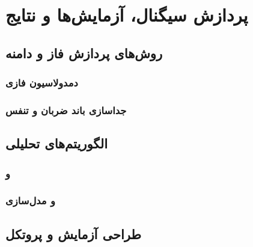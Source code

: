 

\chapter{پردازش سیگنال، آزمایش‌ها و نتایج} %
\label{ch:signal-processing-experiments-results}

\section{روش‌‌های پردازش فاز و دامنه} %
\label{sec:phase-amplitude-processing}

\subsection{دمدولاسیون فازی} %
\label{sec:phase-demodulation}

\subsection{جداسازی باند ضربان و تنفس} %
\label{sec:heart-breath-band-separation}

\section{الگوریتم‌‌های تحلیلی} %
\label{sec:analytical-algorithms}

\subsection{ و } %
\label{sec:fft-stft}

\subsection{ و مدل‌سازی } %
\label{sec:wavelet-ar-modeling}

\section{طراحی آزمایش و پروتکل} %
\label{sec:experiment-design-protocol}

